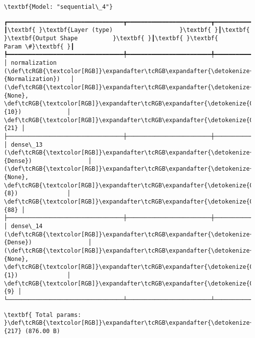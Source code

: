 \documentclass[11pt]{article}
\begin{document}
    
    \begin{Verbatim}[commandchars=\\\{\}]
\textbf{Model: "sequential\_4"}

    \end{Verbatim}

    
    
    \begin{Verbatim}[commandchars=\\\{\}]
┏━━━━━━━━━━━━━━━━━━━━━━━━━━━━━━━━━┳━━━━━━━━━━━━━━━━━━━━━━━━┳━━━━━━━━━━━━━━━┓
┃\textbf{ }\textbf{Layer (type)                   }\textbf{ }┃\textbf{ }\textbf{Output Shape          }\textbf{ }┃\textbf{ }\textbf{      Param \#}\textbf{ }┃
┡━━━━━━━━━━━━━━━━━━━━━━━━━━━━━━━━━╇━━━━━━━━━━━━━━━━━━━━━━━━╇━━━━━━━━━━━━━━━┩
│ normalization (\def\tcRGB{\textcolor[RGB]}\expandafter\tcRGB\expandafter{\detokenize{0,135,255}}{Normalization})   │ (\def\tcRGB{\textcolor[RGB]}\expandafter\tcRGB\expandafter{\detokenize{0,215,255}}{None}, \def\tcRGB{\textcolor[RGB]}\expandafter\tcRGB\expandafter{\detokenize{0,175,0}}{10})             │            \def\tcRGB{\textcolor[RGB]}\expandafter\tcRGB\expandafter{\detokenize{0,175,0}}{21} │
├─────────────────────────────────┼────────────────────────┼───────────────┤
│ dense\_13 (\def\tcRGB{\textcolor[RGB]}\expandafter\tcRGB\expandafter{\detokenize{0,135,255}}{Dense})                │ (\def\tcRGB{\textcolor[RGB]}\expandafter\tcRGB\expandafter{\detokenize{0,215,255}}{None}, \def\tcRGB{\textcolor[RGB]}\expandafter\tcRGB\expandafter{\detokenize{0,175,0}}{8})              │            \def\tcRGB{\textcolor[RGB]}\expandafter\tcRGB\expandafter{\detokenize{0,175,0}}{88} │
├─────────────────────────────────┼────────────────────────┼───────────────┤
│ dense\_14 (\def\tcRGB{\textcolor[RGB]}\expandafter\tcRGB\expandafter{\detokenize{0,135,255}}{Dense})                │ (\def\tcRGB{\textcolor[RGB]}\expandafter\tcRGB\expandafter{\detokenize{0,215,255}}{None}, \def\tcRGB{\textcolor[RGB]}\expandafter\tcRGB\expandafter{\detokenize{0,175,0}}{1})              │             \def\tcRGB{\textcolor[RGB]}\expandafter\tcRGB\expandafter{\detokenize{0,175,0}}{9} │
└─────────────────────────────────┴────────────────────────┴───────────────┘

    \end{Verbatim}

    
    
    \begin{Verbatim}[commandchars=\\\{\}]
\textbf{ Total params: }\def\tcRGB{\textcolor[RGB]}\expandafter\tcRGB\expandafter{\detokenize{0,175,0}}{217} (876.00 B)

    \end{Verbatim}
\end{document}
